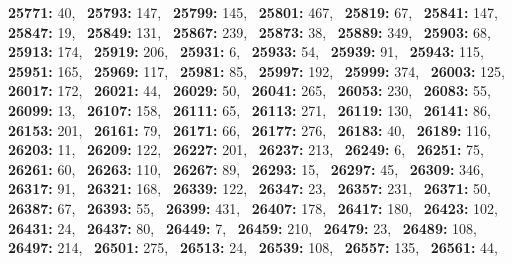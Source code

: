 \textbf{25771:} 40,\allowbreak~ 
\textbf{25793:} 147,\allowbreak~ 
\textbf{25799:} 145,\allowbreak~ 
\textbf{25801:} 467,\allowbreak~ 
\textbf{25819:} 67,\allowbreak~ 
\textbf{25841:} 147,\allowbreak~ 
\textbf{25847:} 19,\allowbreak~ 
\textbf{25849:} 131,\allowbreak~ 
\textbf{25867:} 239,\allowbreak~ 
\textbf{25873:} 38,\allowbreak~ 
\textbf{25889:} 349,\allowbreak~ 
\textbf{25903:} 68,\allowbreak~ 
\textbf{25913:} 174,\allowbreak~ 
\textbf{25919:} 206,\allowbreak~ 
\textbf{25931:} 6,\allowbreak~ 
\textbf{25933:} 54,\allowbreak~ 
\textbf{25939:} 91,\allowbreak~ 
\textbf{25943:} 115,\allowbreak~ 
\textbf{25951:} 165,\allowbreak~ 
\textbf{25969:} 117,\allowbreak~ 
\textbf{25981:} 85,\allowbreak~ 
\textbf{25997:} 192,\allowbreak~ 
\textbf{25999:} 374,\allowbreak~ 
\textbf{26003:} 125,\allowbreak~ 
\textbf{26017:} 172,\allowbreak~ 
\textbf{26021:} 44,\allowbreak~ 
\textbf{26029:} 50,\allowbreak~ 
\textbf{26041:} 265,\allowbreak~ 
\textbf{26053:} 230,\allowbreak~ 
\textbf{26083:} 55,\allowbreak~ 
\textbf{26099:} 13,\allowbreak~ 
\textbf{26107:} 158,\allowbreak~ 
\textbf{26111:} 65,\allowbreak~ 
\textbf{26113:} 271,\allowbreak~ 
\textbf{26119:} 130,\allowbreak~ 
\textbf{26141:} 86,\allowbreak~ 
\textbf{26153:} 201,\allowbreak~ 
\textbf{26161:} 79,\allowbreak~ 
\textbf{26171:} 66,\allowbreak~ 
\textbf{26177:} 276,\allowbreak~ 
\textbf{26183:} 40,\allowbreak~ 
\textbf{26189:} 116,\allowbreak~ 
\textbf{26203:} 11,\allowbreak~ 
\textbf{26209:} 122,\allowbreak~ 
\textbf{26227:} 201,\allowbreak~ 
\textbf{26237:} 213,\allowbreak~ 
\textbf{26249:} 6,\allowbreak~ 
\textbf{26251:} 75,\allowbreak~ 
\textbf{26261:} 60,\allowbreak~ 
\textbf{26263:} 110,\allowbreak~ 
\textbf{26267:} 89,\allowbreak~ 
\textbf{26293:} 15,\allowbreak~ 
\textbf{26297:} 45,\allowbreak~ 
\textbf{26309:} 346,\allowbreak~ 
\textbf{26317:} 91,\allowbreak~ 
\textbf{26321:} 168,\allowbreak~ 
\textbf{26339:} 122,\allowbreak~ 
\textbf{26347:} 23,\allowbreak~ 
\textbf{26357:} 231,\allowbreak~ 
\textbf{26371:} 50,\allowbreak~ 
\textbf{26387:} 67,\allowbreak~ 
\textbf{26393:} 55,\allowbreak~ 
\textbf{26399:} 431,\allowbreak~ 
\textbf{26407:} 178,\allowbreak~ 
\textbf{26417:} 180,\allowbreak~ 
\textbf{26423:} 102,\allowbreak~ 
\textbf{26431:} 24,\allowbreak~ 
\textbf{26437:} 80,\allowbreak~ 
\textbf{26449:} 7,\allowbreak~ 
\textbf{26459:} 210,\allowbreak~ 
\textbf{26479:} 23,\allowbreak~ 
\textbf{26489:} 108,\allowbreak~ 
\textbf{26497:} 214,\allowbreak~ 
\textbf{26501:} 275,\allowbreak~ 
\textbf{26513:} 24,\allowbreak~ 
\textbf{26539:} 108,\allowbreak~ 
\textbf{26557:} 135,\allowbreak~ 
\textbf{26561:} 44,\allowbreak~ 
